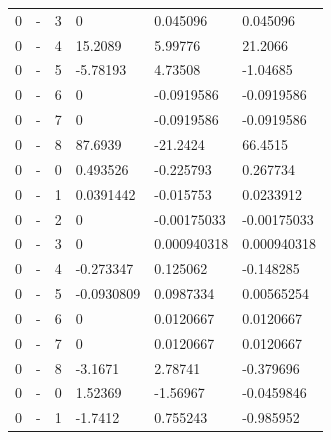 \begin{longtable}
{}0 & \allowbreak{}-\allowbreak{} & 3 & 0 & 0.045096 & 0.045096 \\
{}0 & \allowbreak{}-\allowbreak{} & 4 & 15.2089 & 5.99776 & 21.2066 \\
{}0 & \allowbreak{}-\allowbreak{} & 5 & -5.78193 & 4.73508 & -1.04685 \\
{}0 & \allowbreak{}-\allowbreak{} & 6 & 0 & -0.0919586 & -0.0919586 \\
{}0 & \allowbreak{}-\allowbreak{} & 7 & 0 & -0.0919586 & -0.0919586 \\
{}0 & \allowbreak{}-\allowbreak{} & 8 & 87.6939 & -21.2424 & 66.4515 \\
{}0 & \allowbreak{}-\allowbreak{} & 0 & 0.493526 & -0.225793 & 0.267734 \\
{}0 & \allowbreak{}-\allowbreak{} & 1 & 0.0391442 & -0.015753 & 0.0233912 \\
{}0 & \allowbreak{}-\allowbreak{} & 2 & 0 & -0.00175033 & -0.00175033 \\
{}0 & \allowbreak{}-\allowbreak{} & 3 & 0 & 0.000940318 & 0.000940318 \\
{}0 & \allowbreak{}-\allowbreak{} & 4 & -0.273347 & 0.125062 & -0.148285 \\
{}0 & \allowbreak{}-\allowbreak{} & 5 & -0.0930809 & 0.0987334 & 0.00565254 \\
{}0 & \allowbreak{}-\allowbreak{} & 6 & 0 & 0.0120667 & 0.0120667 \\
{}0 & \allowbreak{}-\allowbreak{} & 7 & 0 & 0.0120667 & 0.0120667 \\
{}0 & \allowbreak{}-\allowbreak{} & 8 & -3.1671 & 2.78741 & -0.379696 \\
{}0 & \allowbreak{}-\allowbreak{} & 0 & 1.52369 & -1.56967 & -0.0459846 \\
{}0 & \allowbreak{}-\allowbreak{} & 1 & -1.7412 & 0.755243 & -0.985952 \\

\end{longtable}
